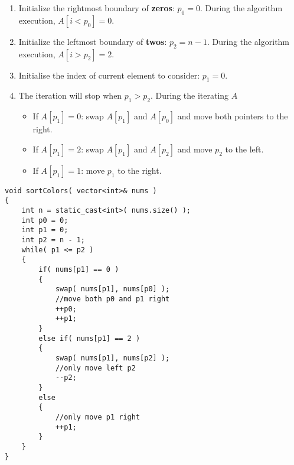 \begin{enumerate}
\item Initialize the rightmost boundary of \textbf{zeros}: $p_0 = 0$. During the algorithm execution, $A[i < p_0] = 0$.

\item Initialize the leftmost boundary of \textbf{twos}: $p_2 = n - 1$. During the algorithm execution, $A[i > p_2] = 2$.

\item Initialise the index of current element to consider: $p_1 = 0$.

\item The iteration will stop when $p_1 > p_2$. During the iterating $A$

\begin{itemize}
\item If $A[p_1] = 0$: swap $A[p_1]$ and $A[p_0]$ and move both pointers to the right.
\item If $A[p_1] = 2$: swap $A[p_1]$ and $A[p_2]$ and move $p_2$ to the left.
\item If $A[p_1] = 1$: move $p_1$ to the right.
\end{itemize}
\end{enumerate}

\setcounter{lstlisting}{0}
\begin{lstlisting}[style=customc, caption={One Pass}]
void sortColors( vector<int>& nums )
{
    int n = static_cast<int>( nums.size() );
    int p0 = 0;
    int p1 = 0;
    int p2 = n - 1;
    while( p1 <= p2 )
    {
        if( nums[p1] == 0 )
        {
            swap( nums[p1], nums[p0] );
            //move both p0 and p1 right
            ++p0;
            ++p1;
        }
        else if( nums[p1] == 2 )
        {
            swap( nums[p1], nums[p2] );
            //only move left p2
            --p2;
        }
        else
        {
            //only move p1 right
            ++p1;
        }
    }
}
\end{lstlisting}
